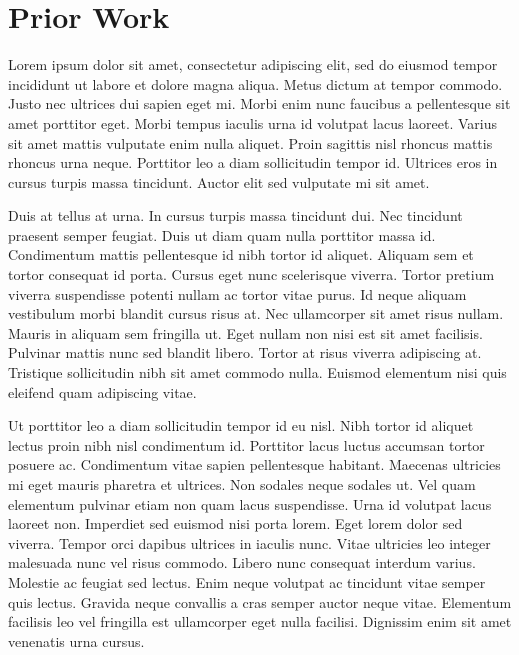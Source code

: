 \chapter{Prior Work}
Lorem ipsum dolor sit amet, consectetur adipiscing elit, sed do eiusmod tempor incididunt ut labore et dolore magna aliqua. Metus dictum at tempor commodo. Justo nec ultrices dui sapien eget mi. Morbi enim nunc faucibus a pellentesque sit amet porttitor eget. Morbi tempus iaculis urna id volutpat lacus laoreet. Varius sit amet mattis vulputate enim nulla aliquet. Proin sagittis nisl rhoncus mattis rhoncus urna neque. Porttitor leo a diam sollicitudin tempor id. Ultrices eros in cursus turpis massa tincidunt. Auctor elit sed vulputate mi sit amet.

Duis at tellus at urna. In cursus turpis massa tincidunt dui. Nec tincidunt praesent semper feugiat. Duis ut diam quam nulla porttitor massa id. Condimentum mattis pellentesque id nibh tortor id aliquet. Aliquam sem et tortor consequat id porta. Cursus eget nunc scelerisque viverra. Tortor pretium viverra suspendisse potenti nullam ac tortor vitae purus. Id neque aliquam vestibulum morbi blandit cursus risus at. Nec ullamcorper sit amet risus nullam. Mauris in aliquam sem fringilla ut. Eget nullam non nisi est sit amet facilisis. Pulvinar mattis nunc sed blandit libero. Tortor at risus viverra adipiscing at. Tristique sollicitudin nibh sit amet commodo nulla. Euismod elementum nisi quis eleifend quam adipiscing vitae.

Ut porttitor leo a diam sollicitudin tempor id eu nisl. Nibh tortor id aliquet lectus proin nibh nisl condimentum id. Porttitor lacus luctus accumsan tortor posuere ac. Condimentum vitae sapien pellentesque habitant. Maecenas ultricies mi eget mauris pharetra et ultrices. Non sodales neque sodales ut. Vel quam elementum pulvinar etiam non quam lacus suspendisse. Urna id volutpat lacus laoreet non. Imperdiet sed euismod nisi porta lorem. Eget lorem dolor sed viverra. Tempor orci dapibus ultrices in iaculis nunc. Vitae ultricies leo integer malesuada nunc vel risus commodo. Libero nunc consequat interdum varius. Molestie ac feugiat sed lectus. Enim neque volutpat ac tincidunt vitae semper quis lectus. Gravida neque convallis a cras semper auctor neque vitae. Elementum facilisis leo vel fringilla est ullamcorper eget nulla facilisi. Dignissim enim sit amet venenatis urna cursus.

